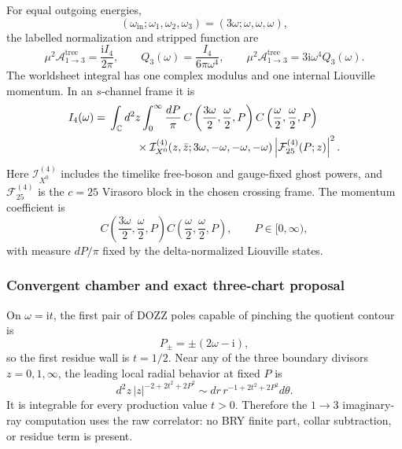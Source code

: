 \documentclass[11pt]{article}
\newcommand{\ii}{\mathrm{i}}
\newcommand{\A}{\mathcal{A}}
\begin{document}
For equal outgoing energies,
\begin{equation}
  (\omega_{\mathrm{in}};\omega_1,\omega_2,\omega_3)
  =(3\omega;\omega,\omega,\omega),
\end{equation}
the labelled normalization and stripped function are
\begin{equation}
  \mu^2\A^{\mathrm{tree}}_{1\to3}=\frac{\ii I_4}{2\pi},
  \qquad
  Q_3(\omega)=\frac{I_4}{6\pi\omega^4},
  \qquad
  \mu^2\A^{\mathrm{tree}}_{1\to3}=3\ii\omega^4Q_3(\omega).
  \label{eq:define-Q3}
\end{equation}
The worldsheet integral has one complex modulus and one internal Liouville
momentum.  In an $s$-channel frame it is
\begin{equation}
 \begin{split}
 I_4(\omega)={}&\int_{\mathbb C}d^2z
 \int_0^\infty\frac{dP}{\pi}\,
 C\left(\frac{3\omega}{2},\frac{\omega}{2},P\right)
 C\left(\frac{\omega}{2},\frac{\omega}{2},P\right)\\
 &\hspace{2.5em}\times
 \mathcal I_{X^0}^{(4)}(z,\bar z;3\omega,-\omega,-\omega,-\omega)
 \left|\mathcal F_{25}^{(4)}(P;z)\right|^2 .
 \end{split}
 \label{eq:I4-worldsheet-integrand}
\end{equation}
Here $\mathcal I_{X^0}^{(4)}$ includes the timelike free-boson and
gauge-fixed ghost powers, and $\mathcal F_{25}^{(4)}$ is the $c=25$
Virasoro block in the chosen crossing frame.  The momentum coefficient is
\begin{equation}
 C\left(\frac{3\omega}{2},\frac{\omega}{2},P\right)
 C\left(\frac{\omega}{2},\frac{\omega}{2},P\right),
 \qquad P\in[0,\infty),
 \label{eq:Q3-DOZZ-product}
\end{equation}
with measure $dP/\pi$ fixed by the delta-normalized Liouville states.

\subsubsection{Convergent chamber and exact three-chart proposal}

On $\omega=\ii t$, the first pair of DOZZ poles capable of pinching the
quotient contour is
\begin{equation}
  P_\pm=\pm(2\omega-\ii),
\end{equation}
so the first residue wall is $t=1/2$.  Near any of the three boundary
divisors $z=0,1,\infty$, the leading local radial behavior at fixed $P$ is
\begin{equation}
 d^2z\,|z|^{-2+2t^2+2P^2}
 \sim dr\,r^{-1+2t^2+2P^2}d\theta.
 \label{eq:Q3-boundary-power}
\end{equation}
It is integrable for every production value $t>0$.  Therefore the
$1\to3$ imaginary-ray computation uses the raw correlator: no BRY finite
part, collar subtraction, or residue term is present.
\end{document}
